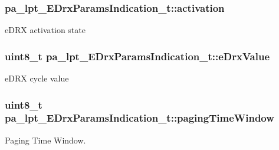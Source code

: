 \subsubsection[{\texorpdfstring{activation}{activation}}]{ pa\+\_\+lpt\+\_\+\+E\+Drx\+Params\+Indication\+\_\+t\+::activation}\hypertarget{structpa__lpt___e_drx_params_indication__t_a0a259433b98e8ad1f6175322c3b4b42b}{}\label{structpa__lpt___e_drx_params_indication__t_a0a259433b98e8ad1f6175322c3b4b42b}


e\+D\+RX activation state 

\subsubsection[{\texorpdfstring{e\+Drx\+Value}{eDrxValue}}]{\setlength{\rightskip}{0pt plus 5cm}uint8\+\_\+t pa\+\_\+lpt\+\_\+\+E\+Drx\+Params\+Indication\+\_\+t\+::e\+Drx\+Value}\hypertarget{structpa__lpt___e_drx_params_indication__t_a54889e981bf5bb497b6dc7043b6e31db}{}\label{structpa__lpt___e_drx_params_indication__t_a54889e981bf5bb497b6dc7043b6e31db}


e\+D\+RX cycle value 

\subsubsection[{\texorpdfstring{paging\+Time\+Window}{pagingTimeWindow}}]{\setlength{\rightskip}{0pt plus 5cm}uint8\+\_\+t pa\+\_\+lpt\+\_\+\+E\+Drx\+Params\+Indication\+\_\+t\+::paging\+Time\+Window}\hypertarget{structpa__lpt___e_drx_params_indication__t_ae6bcdb476f062ac6fe226a5b8bebffb6}{}\label{structpa__lpt___e_drx_params_indication__t_ae6bcdb476f062ac6fe226a5b8bebffb6}


Paging Time Window. 

